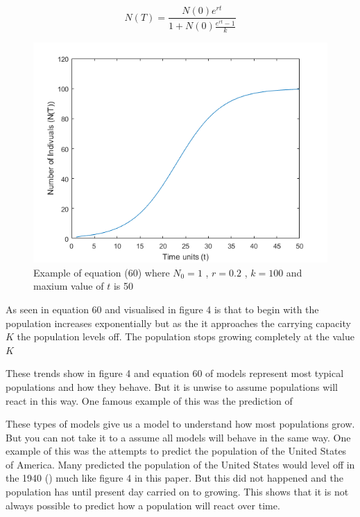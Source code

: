 \documentclass[final]{cmpreport}
\begin{document}
		\begin{equation}
		 N(T)=\frac{N(0)e^{rt}} {1+N(0)\frac {e^{rt}-1}{k} } 
		\end{equation}
		
		
		\begin{figure}[h!] 
			\includegraphics[width=\textwidth]{ContinousLogisticModel.png}
			\caption{Example of equation (60) where $N_0 = 1$ , $r=0.2$ , $k=100$ and maxium value of $t$ is 50}  
		\end{figure}
	
		As seen in equation 60 and visualised in figure 4 is that to begin with the population increases exponentially but as the it approaches the carrying capacity $K$ the population levels off. The population stops growing completely at the value $K$

		These trends show in figure 4 and equation 60  of models represent most typical populations and how they behave. But it is unwise to  assume populations will react in this way. One famous example of this was the prediction of 
		
		These types of models give us a model to understand how most populations grow. But you can not take it to a assume all models will behave in the same way. One example of this was the attempts to predict the population of the United States of America. Many predicted the population of the United States would level off in the 1940 (\cite{Peral}) much like figure 4 in this paper. But this did not happened and the population has until present day carried on to growing. This shows that it is not always possible to predict how a population will react over time.
\end{document}
